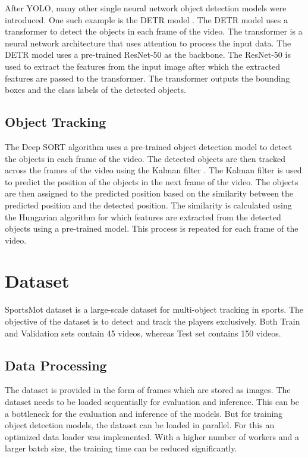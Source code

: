 \documentclass[runningheads]{llncs}
\begin{document}
After YOLO, many other single neural network object detection models were introduced.
One such example is the DETR model \cite{detr2020}.
The DETR model uses a transformer \cite{transformer2017} to detect the objects in each frame of the video.
The transformer is a neural network architecture that uses attention to process the input data.
The DETR model uses a pre-trained ResNet-50 \cite{resnet2015} as the backbone.
The ResNet-50 is used to extract the features from the input image after which the extracted features are passed to the transformer.
The transformer outputs the bounding boxes and the class labels of the detected objects.


\subsection{Object Tracking}
The Deep SORT algorithm uses a pre-trained object detection model to detect the objects in each frame of the video.
The detected objects are then tracked across the frames of the video using the Kalman filter \cite{kalman1960new}.
The Kalman filter is used to predict the position of the objects in the next frame of the video.
The objects are then assigned to the predicted position based on the similarity between the predicted position and the detected position.
The similarity is calculated using the Hungarian algorithm \cite{hungarian1955} for which features are extracted from the detected objects using a pre-trained model.
This process is repeated for each frame of the video.


\section{Dataset}

SportsMot dataset \cite{cui2023sportsmot} is a large-scale dataset for multi-object tracking in sports.
The objective of the dataset is to detect and track the players exclusively.
Both Train and Validation sets contain 45 videos, whereas Test set contains 150 videos.

\subsection{Data Processing}
The dataset is provided in the form of frames which are stored as images.
The dataset needs to be loaded sequentially for evaluation and inference.
This can be a bottleneck for the evaluation and inference of the models.
But for training object detection models, the dataset can be loaded in parallel.
For this an optimized data loader was implemented.
With a higher number of workers and a larger batch size, the training time can be reduced significantly.
\end{document}
